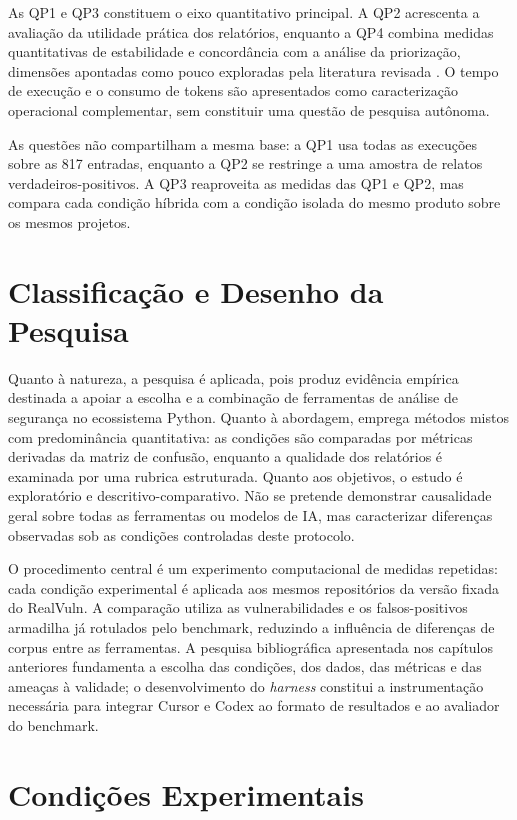 As QP1 e QP3 constituem o eixo quantitativo principal. A QP2 acrescenta a avaliação da utilidade prática dos relatórios, enquanto a QP4 combina medidas quantitativas de estabilidade e concordância com a análise da priorização, dimensões apontadas como pouco exploradas pela literatura revisada \cite{Germano2025LLMSLR, Mao2025ExplainableVD, Tamberg2025LLMHarness}. O tempo de execução e o consumo de tokens são apresentados como caracterização operacional complementar, sem constituir uma questão de pesquisa autônoma.

As questões não compartilham a mesma base: a QP1 usa todas as execuções sobre as 817 entradas, enquanto a QP2 se restringe a uma amostra de relatos verdadeiros-positivos. A QP3 reaproveita as medidas das QP1 e QP2, mas compara cada condição híbrida com a condição isolada do mesmo produto sobre os mesmos projetos.

\section{Classificação e Desenho da Pesquisa}\label{sec:classificacao-pesquisa}

Quanto à natureza, a pesquisa é aplicada, pois produz evidência empírica destinada a apoiar a escolha e a combinação de ferramentas de análise de segurança no ecossistema Python. Quanto à abordagem, emprega métodos mistos com predominância quantitativa: as condições são comparadas por métricas derivadas da matriz de confusão, enquanto a qualidade dos relatórios é examinada por uma rubrica estruturada. Quanto aos objetivos, o estudo é exploratório e descritivo-comparativo. Não se pretende demonstrar causalidade geral sobre todas as ferramentas ou modelos de IA, mas caracterizar diferenças observadas sob as condições controladas deste protocolo.

O procedimento central é um experimento computacional de medidas repetidas: cada condição experimental é aplicada aos mesmos repositórios da versão fixada do RealVuln. A comparação utiliza as vulnerabilidades e os falsos-positivos armadilha já rotulados pelo benchmark, reduzindo a influência de diferenças de corpus entre as ferramentas. A pesquisa bibliográfica apresentada nos capítulos anteriores fundamenta a escolha das condições, dos dados, das métricas e das ameaças à validade; o desenvolvimento do \textit{harness} constitui a instrumentação necessária para integrar Cursor e Codex ao formato de resultados e ao avaliador do benchmark.

\section{Condições Experimentais}\label{sec:condicoes-experimentais}

